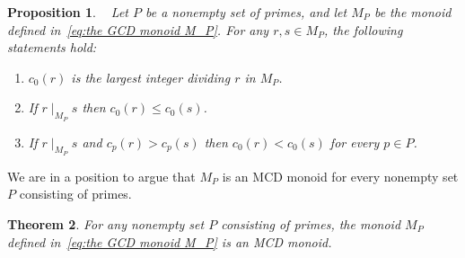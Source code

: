 \documentclass[10pt]{amsart}
\newtheorem{theorem}{Theorem}[section]
\newtheorem{proposition}[theorem]{Proposition}
\theoremstyle{definition}
\theoremstyle{remark}
\numberwithin{equation}{section}
\begin{document}
\begin{proposition}~\cite[Proposition~5.17]{CGGP25} \label{prop:CSD and divisibility}
  Let $P$ be a nonempty set of primes, and let $M_P$ be the monoid defined in~\eqref{eq:the GCD monoid M_P}. For any $r,s \in M_P$, the following statements hold:
  \begin{enumerate}
    \item  $c_0(r)$ is the largest integer dividing $r$ in $M_P$.
      \smallskip

    \item If $r \mid_{M_P} s$ then $c_0(r) \le c_0(s)$.
      \smallskip

    \item If $r \mid_{M_P} s$ and $c_p(r) > c_p(s)$ then $c_0(r) < c_0(s)$ for every $p \in P$.
  \end{enumerate}
\end{proposition}

We are in a position to argue that $M_P$ is an MCD monoid for every nonempty set $P$ consisting of primes.

\begin{theorem} \label{thm:M_P is an MCD monoid}
  For any nonempty set $P$ consisting of primes, the monoid $M_P$ defined in~\eqref{eq:the GCD monoid M_P} is an MCD monoid.
\end{theorem}
\end{document}
